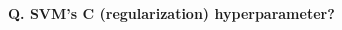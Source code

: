 \begin{frame}[fragile]{\textbf{Q. SVM's C (regularization) hyperparameter?}}
\begin{columns}[T]
\begin{column}{.28\textwidth}
{{{          }
        }
      }
      \vspace{2.5cm}
    \end{column}%
  \end{columns}
\end{frame}



